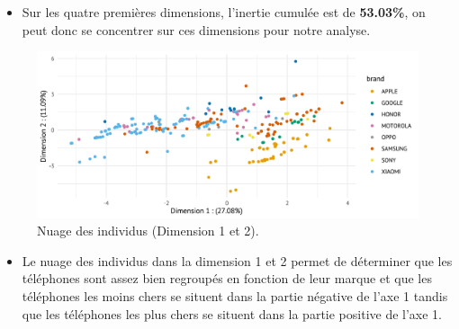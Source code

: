 \documentclass[
  12pt,
]{report}
\providecommand{\tightlist}{%
  \setlength{\itemsep}{0pt}\setlength{\parskip}{0pt}}\usepackage{longtable,booktabs,array}
\begin{document}
\begin{itemize}
\tightlist
\item
  Sur les quatre premières dimensions, l'inertie cumulée est de
  \textbf{53.03\%}, on peut donc se concentrer sur ces dimensions pour
  notre analyse.
\end{itemize}

\begin{figure}[H]

{\centering \includegraphics{report_files/figure-pdf/unnamed-chunk-14-1.pdf}

}

\caption{Nuage des individus (Dimension 1 et 2).}

\end{figure}%

\begin{itemize}
\tightlist
\item
  Le nuage des individus dans la dimension 1 et 2 permet de déterminer
  que les téléphones sont assez bien regroupés en fonction de leur
  marque et que les téléphones les moins chers se situent dans la partie
  négative de l'axe 1 tandis que les téléphones les plus chers se
  situent dans la partie positive de l'axe 1.
\end{itemize}

\newpage
\end{document}
